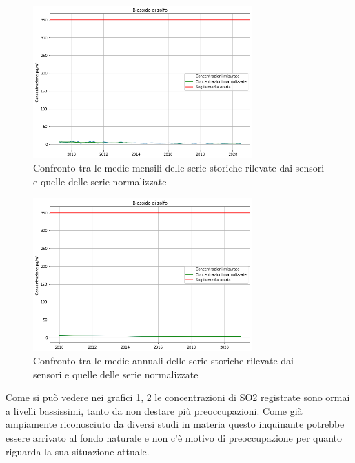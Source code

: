 \begin{figure}[h]
\centering
\includegraphics[width=0.75\textwidth]{so2_medie_mensili}
\caption{Confronto tra le medie mensili delle serie storiche rilevate dai sensori e quelle delle serie normalizzate}
\label{fig:so2_medie_mensili}
\end{figure}

\begin{figure}[h]
\centering
\includegraphics[width=0.75\textwidth]{so2_medie_annuali}
\caption{Confronto tra le medie annuali delle serie storiche rilevate dai sensori e quelle delle serie normalizzate}
\label{fig:so2_medie_annuali}
\end{figure}

Come si può vedere nei grafici \ref{fig:so2_medie_mensili}, \ref{fig:so2_medie_annuali}
le concentrazioni di SO2 registrate sono ormai a livelli bassissimi, tanto da non destare più preoccupazioni. Come già ampiamente riconosciuto da diversi studi in materia \cite{iir2020, scolari2017evoluzione}
 questo inquinante potrebbe essere arrivato al fondo naturale e non c'è motivo di preoccupazione per quanto riguarda la sua situazione attuale.
 
